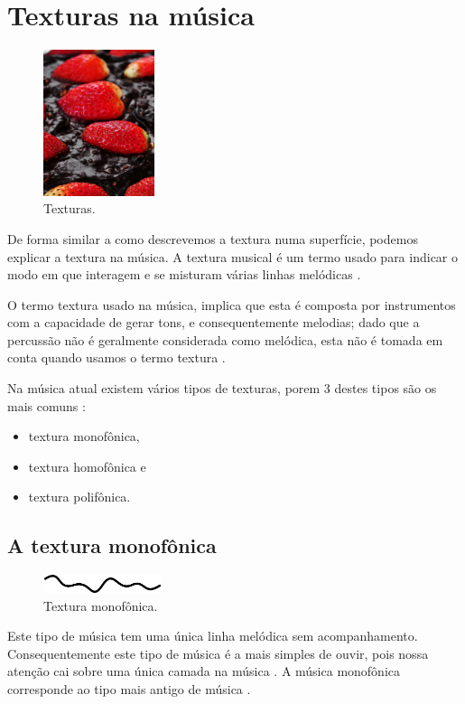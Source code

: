 \section{Texturas na música}
\label{sec:texturasmusica}
\begin{figure}
    \centering 
    \includegraphics[width=0.29\textwidth]{chapters/cap-musicalidade-percepcion/textura.jpg}
  \caption{Texturas.}
\end{figure}
De forma similar a como descrevemos a textura numa superfície,
podemos explicar a textura na música.
A textura musical é um termo usado para indicar o modo em que interagem e 
se misturam várias linhas melódicas \cite[pp. 29]{kerman2015listen}.


O termo textura usado na música, 
implica que esta é composta por instrumentos com a capacidade de gerar tons,
e consequentemente melodias;
dado que a percussão não é geralmente considerada como melódica, 
esta não é tomada em conta quando usamos o termo textura \cite[pp. 59]{holland2013music}.

Na música atual existem  vários tipos de texturas, 
porem 3 destes tipos  são os mais comuns 
\cite[pp. 77]{copland1974ouvir} \cite[pp. 29]{kerman2015listen} \cite[pp. 322]{harnum2009basic}:
\begin{itemize}
\item textura monofônica, 
\item textura homofônica e
\item textura polifônica.
\end{itemize}

 
\subsection{A textura monofônica}
\label{subsec:momofonica}
\begin{figure}
\centering
    \includegraphics[width=0.31\textwidth]{chapters/cap-musicalidade-percepcion/monofonica1.eps}
  \caption{Textura monofônica.}
\end{figure}
Este tipo de música tem uma única linha melódica sem acompanhamento.
Consequentemente este tipo de música é a mais simples de ouvir, 
pois nossa atenção cai sobre uma única camada na música \cite[pp. 77]{copland1974ouvir} \cite[pp. 29]{kerman2015listen}.
A música monofônica corresponde ao tipo mais antigo de música \cite[pp. 539]{apel1969harvard}.


